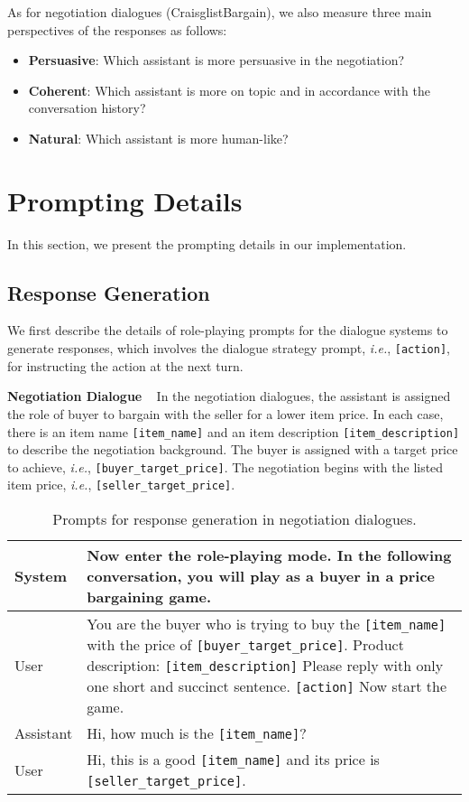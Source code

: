 \documentclass{article} %
\begin{document}
As for negotiation dialogues (CraisglistBargain), we also measure three main perspectives of the responses as follows:
\begin{itemize}[leftmargin=*]
    \item \textbf{Persuasive}:  Which assistant is more persuasive in the negotiation?
    \item \textbf{Coherent}: Which assistant is more on topic and in accordance with the conversation history?
    \item \textbf{Natural}: Which assistant is more human-like?
\end{itemize}

\section{Prompting Details}
In this section, we present the prompting details in our implementation. 

\subsection{Response Generation}\label{app:resp_prompt}
We first describe the details of role-playing prompts for the dialogue systems to generate responses, which involves the dialogue strategy prompt, \textit{i.e.}, \texttt{[action]}, for instructing the action at the next turn. 

\noindent \textbf{Negotiation Dialogue} ~ 
In the negotiation dialogues, the assistant is assigned the role of buyer to bargain with the seller for a lower item price. 
In each case, there is an item name \texttt{[item\_name]} and an item description \texttt{[item\_description]} to describe the negotiation background. 
The buyer is assigned with a target price to achieve, \textit{i.e.}, \texttt{[buyer\_target\_price]}. 
The negotiation begins with the listed item price, \textit{i.e.}, \texttt{[seller\_target\_price]}. 

\begin{table}[h]
    \centering
    \begin{tabular}{lp{11.5cm}}
    \toprule
    System   &  Now enter the role-playing mode. In the following conversation, you will play as a buyer in a price bargaining game. \\
    \midrule
    User    &  You are the buyer who is trying to buy the \texttt{[item\_name]} with the price of \texttt{[buyer\_target\_price]}. Product description: \texttt{[item\_description]}
    Please reply with only one short and succinct sentence. \texttt{[action]} Now start the game.\\
    \midrule
    Assistant & Hi, how much is the \texttt{[item\_name]}? \\
    \midrule
    User & Hi, this is a good \texttt{[item\_name]} and its price is \texttt{[seller\_target\_price]}. \\
    \bottomrule
    \end{tabular}
    \caption{Prompts for response generation in negotiation dialogues.}
    \label{tab:cb_response}
\end{table}
\end{document}
